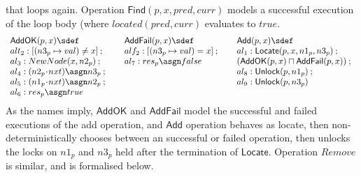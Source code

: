 \documentclass{article}
\def \hasgn{\asgn}
\def\cdota{\!\cdot\!}
\theoremstyle{plain}
\theoremstyle{definition}
\def\ch{\mathbin{;}}
\begin{document}
that loops again. Operation $\mathsf{Find}(p, x, pred, curr)$ models a
successful execution of the loop body (where $located(pred, curr)$
evaluates to $true$.
$$
\begin{array}[t]{l@{\qquad}l@{\qquad}l}
  \begin{array}[t]{@{}l@{}}
    \mathsf{AddOK}(p,x)  \sdef\\
    alt_2:  [(n3_p\mapsto val) \neq x] \ch {} \\
    al_3: NewNode(x, n2_p) \ch  {} \\
    al_4: (n2_p \cdota nxt) \hasgn n3_p \ch {} \\ 
    al_5: (n1_p \cdota nxt) \hasgn n2_p \ch  {} \\
    al_6: res_p \asgn true
  \end{array}
  & 
  \begin{array}[t]{@{}l@{}}
    \mathsf{AddFail}(p,x) \sdef \\
    alf_2: [(n3_p\mapsto val) = x] \ch {} \\
    al_7: res_p \asgn
    false
  \end{array}
  & 
  \begin{array}[t]{@{}l@{}}
    \mathsf{Add}(p,x) \sdef \\
    al_1: \mathsf{Locate}(p, x, n1_p, n3_p) \ch {} \\
    (\mathsf{AddOK}(p,x)
    \sqcap \mathsf{AddFail}(p,x)) \ch {} \\
    al_8:  \mathsf{Unlock}(p, n1_p) \ch {}\\
    al_9:  \mathsf{Unlock}(p, n3_p)
  \end{array}
\end{array}
$$
As the names imply, $\mathsf{AddOK}$ and $\mathsf{AddFail}$ model the
successful and failed executions of the add operation, and
$\mathsf{Add}$ operation behaves as locate, then non-deterministically
chooses between an successful or failed operation, then unlocks the
locks on $n1_p$ and $n3_p$ held after the termination of
$\mathsf{Locate}$. Operation $Remove$ is similar, and is formalised
below. 
\end{document}
